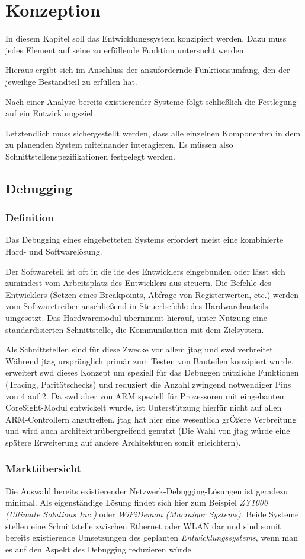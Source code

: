 \chapter{Konzeption}
\minitoc
In diesem Kapitel soll das Entwicklungssystem konzipiert werden.
Dazu muss jedes Element auf seine zu erfüllende Funktion untersucht werden.

Hieraus ergibt sich im Anschluss der anzufordernde Funktionsumfang, den der
jeweilige Bestandteil zu erfüllen hat.

Nach einer Analyse bereits existierender Systeme folgt schließlich die
Festlegung auf ein Entwicklungsziel.

Letztendlich muss sichergestellt werden, dass alle einzelnen Komponenten in dem
zu planenden System miteinander interagieren. Es müssen also
Schnittstellenspezifikationen festgelegt werden.
\section{Debugging}
\subsection{Definition}
Das Debugging eines eingebetteten Systems erfordert meist eine kombinierte Hard-
und Softwarelösung.

Der Softwareteil ist oft in die \gls{ide} des Entwicklers eingebunden oder lässt
sich zumindest vom Arbeitsplatz des Entwicklers aus steuern. Die Befehle des
Entwicklers (Setzen eines Breakpoints, Abfrage von Registerwerten, etc.) werden
vom Softwaretreiber anschließend in Steuerbefehle des Hardwarebauteils
umgesetzt. Das Hardwaremodul übernimmt hierauf, unter Nutzung eine
standardisierten Schnittstelle, die Kommunikation mit dem Zielsystem.

Als Schnittstellen sind für diese Zwecke vor allem \gls{jtag} und \gls{swd}
verbreitet. Während \gls{jtag} ursprünglich primär zum Testen von Bauteilen
konzipiert wurde, erweitert \gls{swd} dieses Konzept um speziell für das
Debuggen nützliche Funktionen (Tracing, Paritätschecks) und reduziert die Anzahl
zwingend notwendiger Pins von 4 auf 2. Da \gls{swd} aber von ARM speziell
für Prozessoren mit eingebautem CoreSight-Modul entwickelt wurde, ist
Unterstützung hierfür nicht auf allen ARM-Controllern anzutreffen. \gls{jtag}
hat hier eine wesentlich grÖßere Verbreitung und wird auch
architekturübergreifend genutzt (Die Wahl von \gls{jtag} würde eine spätere
Erweiterung auf andere Architekturen somit erleichtern).
\subsection{Marktübersicht}
Die Auswahl bereits existierender Netzwerk-Debugging-Lösungen ist geradezu
minimal.
Als eigenständige Lösung findet sich hier zum Beispiel \emph{ZY1000 (Ultimate
Solutions Inc.)} oder \emph{WiFiDemon (Macraigor Systems)}. Beide Systeme
stellen eine Schnittstelle zwischen Ethernet oder WLAN dar und sind somit
bereits existierende Umsetzungen des geplanten \emph{Entwicklungssystems}, wenn
man es auf den Aspekt des Debugging reduzieren würde.

